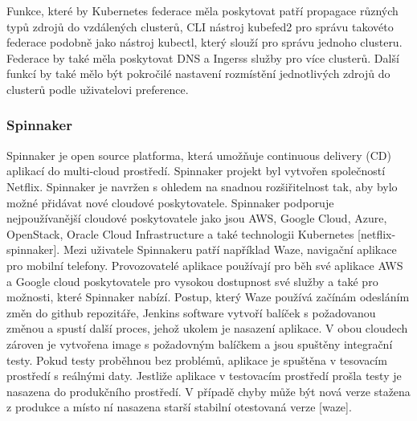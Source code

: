         Funkce, které by Kubernetes federace měla poskytovat patří propagace různých typů zdrojů do vzdálených clusterů, CLI nástroj kubefed2 pro správu takovéto federace podobně jako nástroj kubectl, který slouží pro správu jednoho clusteru. Federace by také měla poskytovat DNS a Ingerss služby pro více clusterů. Další funkcí by také mělo být pokročilé nastavení rozmístění jednotlivých zdrojů do clusterů podle uživatelovi preference.

\subsubsection{Spinnaker}
Spinnaker je open source platforma, která umožňuje continuous delivery (CD) aplikací do multi-cloud prostředí. Spinnaker projekt byl vytvořen společností Netflix. Spinnaker je navržen s ohledem na snadnou rozšiřitelnost tak, aby bylo možné přidávat nové cloudové poskytovatele. Spinnaker podporuje nejpoužívanější cloudové poskytovatele jako jsou AWS, Google Cloud, Azure, OpenStack, Oracle Cloud Infrastructure a také technologii Kubernetes [netflix-spinnaker]. Mezi uživatele Spinnakeru patří například Waze, navigační aplikace pro mobilní telefony. Provozovatelé aplikace používají pro běh své aplikace AWS a Google cloud poskytovatele pro vysokou dostupnost své služby a také pro možnosti, které Spinnaker nabízí. Postup, který Waze používá začínám odesláním změn do github repozitáře, Jenkins software vytvoří balíček s požadovanou změnou a spustí další proces, jehož ukolem je nasazení aplikace. V obou cloudech zároven je vytvořena image s požadovným balíčkem a jsou spuštěny integrační testy. Pokud testy proběhnou bez problémů, aplikace je spuštěna v tesovacím prostředí s reálnými daty. Jestliže aplikace v testovacím prostředí prošla testy je nasazena do produkčního prostředí. V případě chyby může být nová verze stažena z produkce a místo ní nasazena starší stabilní otestovaná verze [waze].\par
